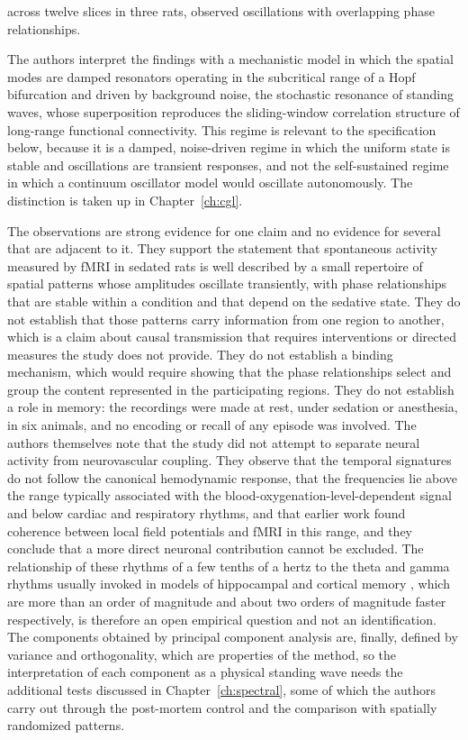 across twelve slices in three rats, observed oscillations with overlapping phase relationships.

The authors interpret the findings with a mechanistic model in which the spatial modes are damped resonators operating in the subcritical range of a Hopf bifurcation and driven by background noise, the stochastic resonance of standing waves, whose superposition reproduces the sliding-window correlation structure of long-range functional connectivity. This regime is relevant to the specification below, because it is a damped, noise-driven regime in which the uniform state is stable and oscillations are transient responses, and not the self-sustained regime in which a continuum oscillator model would oscillate autonomously. The distinction is taken up in Chapter~\ref{ch:cgl}.

The observations are strong evidence for one claim and no evidence for several that are adjacent to it. They support the statement that spontaneous activity measured by fMRI in sedated rats is well described by a small repertoire of spatial patterns whose amplitudes oscillate transiently, with phase relationships that are stable within a condition and that depend on the sedative state. They do not establish that those patterns carry information from one region to another, which is a claim about causal transmission that requires interventions or directed measures the study does not provide. They do not establish a binding mechanism, which would require showing that the phase relationships select and group the content represented in the participating regions. They do not establish a role in memory: the recordings were made at rest, under sedation or anesthesia, in six animals, and no encoding or recall of any episode was involved. The authors themselves note that the study did not attempt to separate neural activity from neurovascular coupling. They observe that the temporal signatures do not follow the canonical hemodynamic response, that the frequencies lie above the range typically associated with the blood-oxygenation-level-dependent signal and below cardiac and respiratory rhythms, and that earlier work found coherence between local field potentials and fMRI in this range, and they conclude that a more direct neuronal contribution cannot be excluded. The relationship of these rhythms of a few tenths of a hertz to the theta and gamma rhythms usually invoked in models of hippocampal and cortical memory \cite{buzsaki2006,lisman2013}, which are more than an order of magnitude and about two orders of magnitude faster respectively, is therefore an open empirical question and not an identification. The components obtained by principal component analysis are, finally, defined by variance and orthogonality, which are properties of the method, so the interpretation of each component as a physical standing wave needs the additional tests discussed in Chapter~\ref{ch:spectral}, some of which the authors carry out through the post-mortem control and the comparison with spatially randomized patterns.

